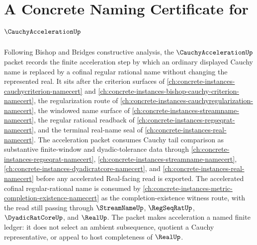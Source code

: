 \chapter{A Concrete Naming Certificate for $\CauchyAccelerationUp$}
\label{ch:concrete-instances-cauchy-acceleration-namecert}

Following Bishop and Bridges constructive analysis, the $\CauchyAccelerationUp$ packet records the finite acceleration step by which an ordinary displayed Cauchy name is replaced by a cofinal regular rational name without changing the represented real. It sits after the criterion surfaces of \autoref{ch:concrete-instances-cauchycriterion-namecert} and \autoref{ch:concrete-instances-bishop-cauchy-criterion-namecert}, the regularization route of \autoref{ch:concrete-instances-cauchyregularization-namecert}, the windowed name surface of \autoref{ch:concrete-instances-streamname-namecert}, the regular rational readback of \autoref{ch:concrete-instances-regseqrat-namecert}, and the terminal real-name seal of \autoref{ch:concrete-instances-real-namecert}. The acceleration packet consumes Cauchy tail comparison as substantive finite-window and dyadic-tolerance data through \autoref{ch:concrete-instances-regseqrat-namecert}, \autoref{ch:concrete-instances-streamname-namecert}, \autoref{ch:concrete-instances-dyadicratcore-namecert}, and \autoref{ch:concrete-instances-real-namecert} before any accelerated Real-facing read is exported. The accelerated cofinal regular-rational name is consumed by \autoref{ch:concrete-instances-metric-completion-existence-namecert} as the completion-existence witness route, with the read still passing through $\StreamNameUp$, $\RegSeqRatUp$, $\DyadicRatCoreUp$, and $\RealUp$. The packet makes acceleration a named finite ledger: it does not select an ambient subsequence, quotient a Cauchy representative, or appeal to host completeness of $\RealUp$.

